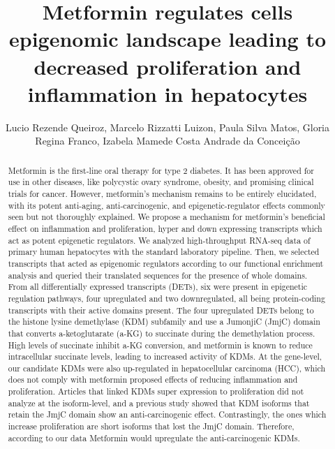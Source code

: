 \documentclass[twoside]{article}
\title{\vspace{-15mm}\fontsize{24pt}{10pt}\selectfont\textbf{ Metformin regulates cells epigenomic landscape leading to decreased proliferation and  inflammation in hepatocytes }} %
\author{ Lucio Rezende Queiroz,  Marcelo Rizzatti Luizon,  Paula Silva Matos,  Gloria Regina Franco,  Izabela Mamede Costa Andrade da Concei\c{c}\~ao }
\affil{ UFMG,  UNIVERSIDADE FEDERAL DE MINAS GERAIS,  UFMG - Departamento de Bioqu\'{\i}mica e Imunologia,  UNIVERSIDADE FEDERAL DE MINAS GERAIS }
\date{}
\begin{document}
  
  
  \maketitle %
  
  
  \thispagestyle{fancy} %
  
  
  \begin{abstract}
  Metformin is the first-line oral therapy for type 2 diabetes. It has been approved for use in other diseases,  like polycystic ovary syndrome,  obesity,  and promising clinical trials for cancer. However,  metformin's mechanism remains to be entirely elucidated,  with its potent anti-aging,  anti-carcinogenic,  and epigenetic-regulator effects commonly seen but not thoroughly explained.  
We propose a mechanism for metformin’s beneficial effect on inflammation and proliferation,  hyper and down expressing transcripts which act as potent epigenetic regulators. We analyzed high-throughput RNA-seq data of primary human hepatocytes with the standard laboratory pipeline. Then,  we selected transcripts that acted as epigenomic regulators according to our functional enrichment analysis and queried their translated sequences for the presence of whole domains.
From all differentially expressed transcripts (DETs),  six were present in epigenetic regulation pathways,  four upregulated and two downregulated,  all being protein-coding transcripts with their active domains present. 
The four upregulated DETs belong to the histone lysine demethylase (KDM) subfamily and use a JumonjiC (JmjC) domain that converts a-ketoglutarate (a-KG) to succinate during the demethylation process. High levels of succinate inhibit a-KG conversion,  and metformin is known to reduce intracellular succinate levels,  leading to increased activity of KDMs. At the gene-level,  our candidate KDMs were also up-regulated in hepatocellular carcinoma (HCC),  which does not comply with metformin proposed effects of reducing inflammation and proliferation. Articles that linked KDMs super expression to proliferation did not analyze at the isoform-level,  and a previous study showed that KDM isoforms that retain the JmjC domain show an anti-carcinogenic effect. Contrastingly,  the ones which increase proliferation are short isoforms that lost the JmjC domain. Therefore,  according to our data Metformin would upregulate the anti-carcinogenic KDMs.

\end{abstract}
\end{document}
